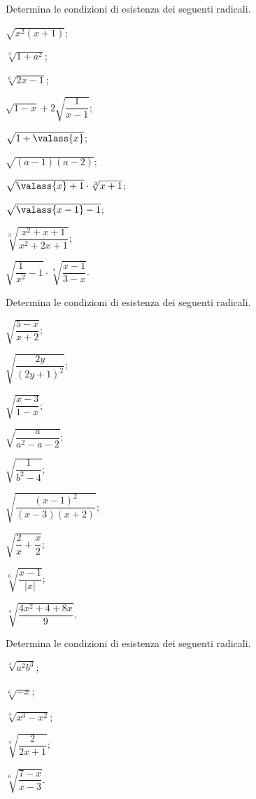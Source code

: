 \begin{esercizio}[\Ast]
 \label{ese:2.12}
Determina le condizioni di esistenza dei seguenti radicali.
 \begin{multicols}{3}
 \begin{enumeratea}
 \item $\sqrt{x^2(x+1)}$;
 \item $\sqrt[3]{1+a^2}$;
 \item $\sqrt[6]{2x-1}$;
 \item $\sqrt{1-x}+2\sqrt{\dfrac 1{x-1}}$;
 \item $\sqrt{1+\valass{x}}$;
 \item $\sqrt{(a-1)(a-2)}$;
 \item $\sqrt{\valass{x}+1}\cdot \sqrt[3]{x+1}$;
 \item $\sqrt{\valass{x-1}-1}$;
 \item $\sqrt[3]{\dfrac{x^2+x+1}{x^2+2x+1}}$;
 \item $\sqrt{\dfrac 1{x^2}-1}\cdot \sqrt[4]{\dfrac{x-1}{3-x}}$.
 \end{enumeratea}
 \end{multicols}
\end{esercizio}

\begin{esercizio}[\Ast]
 \label{ese:2.13}
Determina le condizioni di esistenza dei seguenti radicali.
 \begin{multicols}{3}
 \begin{enumeratea}
 \item $\sqrt{\dfrac{5-x}{x+2}}$;
 \item $\sqrt{\dfrac{2y}{(2y+1)^2}}$;
 \item $\sqrt{\dfrac{x-3}{1-x}}$;
 \item $\sqrt{\dfrac a{a^2-a-2}}$;
 \item $\sqrt{\dfrac 1{b^2-4}}$;
 \item $\sqrt{\dfrac{(x-1)^2}{(x-3)(x+2)}}$;
 \item $\sqrt{\dfrac 2 x+\dfrac x 2}$;
 \item $\sqrt[6]{\dfrac{x-1}{\left|x\right|}}$;
 \item $\sqrt[4]{\dfrac{4x^2+4+8x} 9}$.
 \end{enumeratea}
 \end{multicols}
\end{esercizio}

\begin{esercizio}[\Ast]
Determina le condizioni di esistenza dei seguenti radicali.
 \label{ese:2.14}
 \begin{multicols}{3}
 \begin{enumeratea}
 \item $\sqrt[4]{a^2 b^3}$;
 \item $\sqrt[6]{-x}$;
 \item $\sqrt[4]{x^3 - x^2}$;
 \item $\sqrt[4]{\dfrac{2}{2x+1}}$;
 \item $\sqrt[6]{\dfrac{7-x}{x-3}}$.
 \end{enumeratea}
 \end{multicols}
\end{esercizio}

